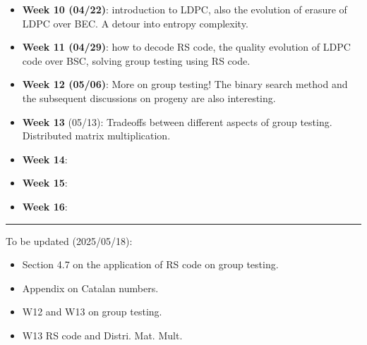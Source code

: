 \begin{itemize}
    \item \textbf{Week 10 (04/22)}: introduction to LDPC, also the evolution of erasure of LDPC over BEC. A detour into entropy complexity.
    \item \textbf{Week 11 (04/29)}: how to decode RS code, the quality evolution of LDPC code over BSC, solving group testing using RS code.
    \item \textbf{Week 12 (05/06)}: More on group testing! The binary search method and the subsequent discussions on progeny are also interesting.
    \item \textbf{Week 13} (05/13): Tradeoffs between different aspects of group testing. Distributed matrix multiplication.
    \item \textbf{Week 14}:
    \item \textbf{Week 15}:
    \item \textbf{Week 16}:
\end{itemize}

\vspace{1cm}
\hrule
To be updated (2025/05/18):
\begin{itemize}
    \item Section 4.7 on the application of RS code on group testing.
    \item Appendix on Catalan numbers.
    \item W12 and W13 on group testing.
    \item W13 RS code and Distri. Mat. Mult.
\end{itemize}